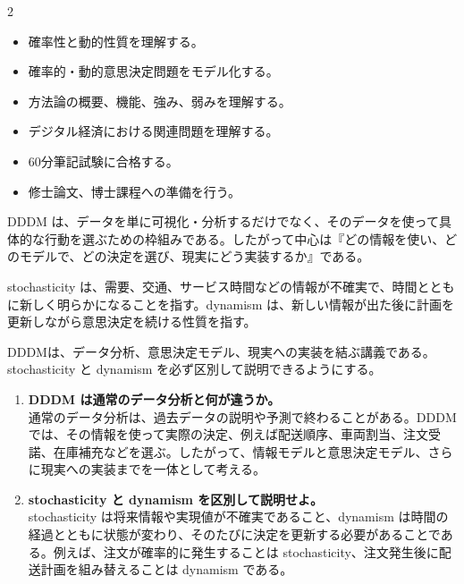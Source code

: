 \clearpage



\vspace{1.5mm}

\begin{multicols}{2}

\footnotesize

\raggedcolumns


\begin{itemize}
\item 確率性と動的性質を理解する。
\item 確率的・動的意思決定問題をモデル化する。
\item 方法論の概要、機能、強み、弱みを理解する。
\item デジタル経済における関連問題を理解する。
\item 60分筆記試験に合格する。
\item 修士論文、博士課程への準備を行う。
\end{itemize}

DDDM は、データを単に可視化・分析するだけでなく、そのデータを使って具体的な行動を選ぶための枠組みである。したがって中心は『どの情報を使い、どのモデルで、どの決定を選び、現実にどう実装するか』である。\par

stochasticity は、需要、交通、サービス時間などの情報が不確実で、時間とともに新しく明らかになることを指す。dynamism は、新しい情報が出た後に計画を更新しながら意思決定を続ける性質を指す。\par

DDDMは、データ分析、意思決定モデル、現実への実装を結ぶ講義である。stochasticity と dynamism を必ず区別して説明できるようにする。\par

\begin{enumerate}
\item \textbf{DDDM は通常のデータ分析と何が違うか。}\\
通常のデータ分析は、過去データの説明や予測で終わることがある。DDDMでは、その情報を使って実際の決定、例えば配送順序、車両割当、注文受諾、在庫補充などを選ぶ。したがって、情報モデルと意思決定モデル、さらに現実への実装までを一体として考える。
\item \textbf{stochasticity と dynamism を区別して説明せよ。}\\
stochasticity は将来情報や実現値が不確実であること、dynamism は時間の経過とともに状態が変わり、そのたびに決定を更新する必要があることである。例えば、注文が確率的に発生することは stochasticity、注文発生後に配送計画を組み替えることは dynamism である。
\end{enumerate}

\end{multicols}

